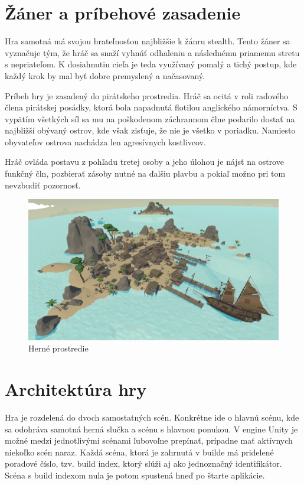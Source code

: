 \documentclass[slovak, master]{diploma}
\begin{document}
\section{Žáner a príbehové zasadenie}
\label{sec:GenreAndSetting}
Hra samotná má svojou hrateľnosťou najbližšie k žánru stealth. Tento žáner sa vyznačuje tým, že hráč sa snaží vyhnúť odhaleniu a následnému priamemu stretu s nepriateľom. K dosiahnutiu cieľa je teda využívaný pomalý a tichý postup, kde každý krok by mal byť dobre premyslený a načasovaný. 

Príbeh hry je zasadený do pirátskeho prostredia. Hráč sa ocitá v roli radového člena pirátskej posádky, ktorá bola napadnutá flotilou anglického námorníctva. S vypätím všetkých síl sa mu na poškodenom záchrannom člne podarilo dostať na najbližší obývaný ostrov, kde však zisťuje, že nie je všetko v poriadku. Namiesto obyvateľov ostrova nachádza len agresívnych kostlivcov. 

Hráč ovláda postavu z pohľadu tretej osoby a jeho úlohou je nájsť na ostrove funkčný čln, pozbierať zásoby nutné na ďalšiu plavbu a pokiaľ možno pri tom nevzbudiť pozornosť.

\begin{figure}[!htbp]
    \centering
    \includegraphics[width=.9\textwidth]{Figures/game_compressed.png}
    \caption{Herné prostredie}
    \label{pic:GameScreenshot}
\end{figure}

\section{Architektúra hry}
\label{sec:GameStructure}
Hra je rozdelená do dvoch samostatných scén. Konkrétne ide o hlavnú scénu, kde sa odohráva samotná herná slučka a scénu s hlavnou ponukou. V engine Unity je možné medzi jednotlivými scénami ľubovoľne prepínať, prípadne mať aktívnych niekoľko scén naraz. Každá scéna, ktorá je zahrnutá v builde má pridelené poradové číslo, tzv. build index, ktorý slúži aj ako jednoznačný identifikátor. Scéna s build indexom nula je potom spustená hneď po štarte aplikácie.
\end{document}

